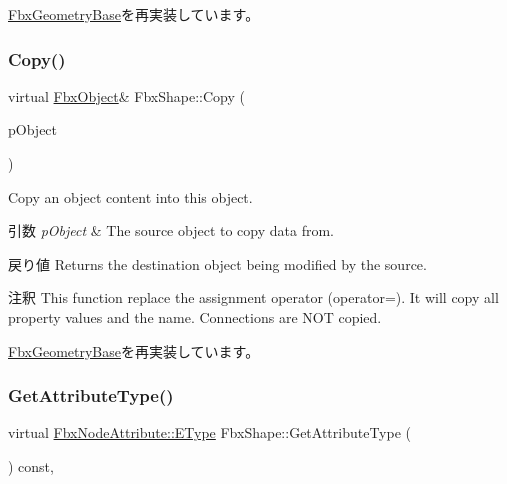 \hyperlink{class_fbx_geometry_base_a66146155ecad4e6f6f2e8cf52e0340f6}{Fbx\+Geometry\+Base}を再実装しています。

\mbox{\label{class_fbx_shape_ab9776a1c0ce41830bc6841ebba4c4a23}} 
\subsubsection{\texorpdfstring{Copy()}{Copy()}}
{\footnotesize\ttfamily virtual \hyperlink{class_fbx_object}{Fbx\+Object}\& Fbx\+Shape\+::\+Copy (\begin{DoxyParamCaption}\item[{const \hyperlink{class_fbx_object}{Fbx\+Object} \&}]{p\+Object }\end{DoxyParamCaption})\hspace{0.3cm}{\ttfamily [virtual]}}

Copy an object content into this object. 
\begin{DoxyParams}{引数}
{\em p\+Object} & The source object to copy data from. \\
\hline
\end{DoxyParams}
\begin{DoxyReturn}{戻り値}
Returns the destination object being modified by the source. 
\end{DoxyReturn}
\begin{DoxyRemark}{注釈}
This function replace the assignment operator (operator=). It will copy all property values and the name. Connections are N\+OT copied. 
\end{DoxyRemark}


\hyperlink{class_fbx_geometry_base_a2c3754831338327259c35caebbf379d3}{Fbx\+Geometry\+Base}を再実装しています。

\mbox{\label{class_fbx_shape_a976141cda408244bd89c44c7a6b22d4b}} 
\subsubsection{\texorpdfstring{Get\+Attribute\+Type()}{GetAttributeType()}}
{\footnotesize\ttfamily virtual \hyperlink{class_fbx_node_attribute_a08e1669d3d1a696910756ab17de56d6a}{Fbx\+Node\+Attribute\+::\+E\+Type} Fbx\+Shape\+::\+Get\+Attribute\+Type (\begin{DoxyParamCaption}{ }\end{DoxyParamCaption}) const\hspace{0.3cm}{\ttfamily [protected]}, {\ttfamily [virtual]}}

